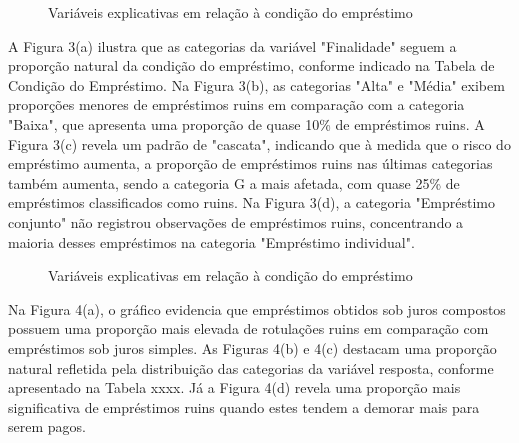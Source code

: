 \begin{figure}[H]
    \centering
    \vspace{.5cm}
    \vspace{.5cm}
    
    \label{fig:exp_bar1}
    \caption{Variáveis explicativas em relação à condição do empréstimo}
\end{figure}


A Figura 3(a) ilustra que as categorias da variável "Finalidade" seguem a proporção natural da condição do empréstimo,
conforme indicado na Tabela de Condição do Empréstimo. Na Figura 3(b), as categorias "Alta" e "Média"
exibem proporções menores de empréstimos ruins em comparação com a categoria "Baixa", que apresenta uma proporção de quase 10\% 
de empréstimos ruins. A Figura 3(c) revela um padrão de "cascata", indicando que à medida que o risco do 
empréstimo aumenta, a proporção de empréstimos ruins nas últimas categorias também aumenta, 
sendo a categoria G a mais afetada, com quase 25\% de empréstimos classificados como ruins. 
Na Figura 3(d), a categoria "Empréstimo conjunto" não registrou observações de empréstimos ruins, 
concentrando a maioria desses empréstimos na categoria "Empréstimo individual".


\begin{figure}[H]
  \centering
  \vspace{.5cm}
  \vspace{.5cm}

  \label{fig:exp_bar2}
  \caption{Variáveis explicativas em relação à condição do empréstimo}
\end{figure}

Na Figura 4(a), o gráfico evidencia que empréstimos obtidos sob juros compostos possuem uma proporção 
mais elevada de rotulações ruins em comparação com empréstimos sob juros simples. As Figuras 4(b) e 4(c)
destacam uma proporção natural refletida pela distribuição das categorias da variável resposta, 
conforme apresentado na Tabela xxxx. Já a Figura 4(d) revela uma proporção mais significativa
de empréstimos ruins quando estes tendem a demorar mais para serem pagos.

